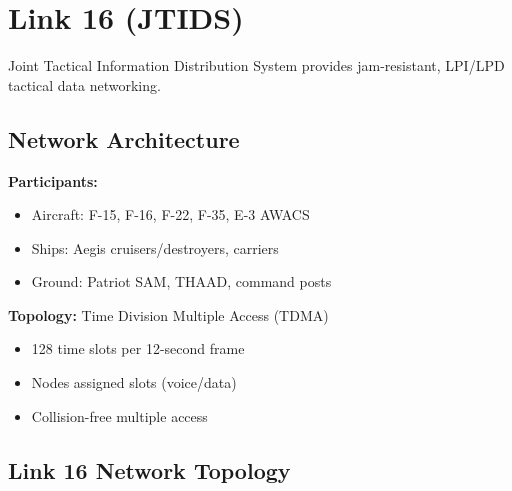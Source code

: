 \section{Link 16 (JTIDS)}

Joint Tactical Information Distribution System provides jam-resistant, LPI/LPD tactical data networking.

\subsection{Network Architecture}

\textbf{Participants:}
\begin{itemize}
\item Aircraft: F-15, F-16, F-22, F-35, E-3 AWACS
\item Ships: Aegis cruisers/destroyers, carriers
\item Ground: Patriot SAM, THAAD, command posts
\end{itemize}

\textbf{Topology:} Time Division Multiple Access (TDMA)
\begin{itemize}
\item 128 time slots per 12-second frame
\item Nodes assigned slots (voice/data)
\item Collision-free multiple access
\end{itemize}

\subsection{Link 16 Network Topology}


